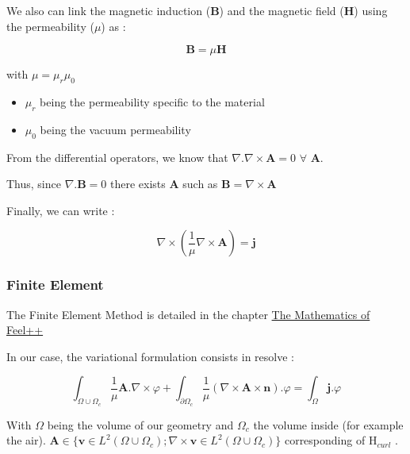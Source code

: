 \documentclass[11pt]{amsart}
\begin{document}
We also can link the magnetic induction (\textbf{B}) and the magnetic field (\textbf{H}) using the permeability ($\mu$) as :



\[
\textbf{B}=\mu\textbf{H}
\]



with $\mu=\mu_{r}\mu_{0}$


\begin{itemize}

\item $\mu_{r}$ being the permeability specific to the material

\item $\mu_{0}$ being the vacuum permeability

\end{itemize}


From the differential operators, we know that $\nabla.\nabla\times\textbf{A}=0$    $\forall$ \textbf{A}.


Thus, since $\nabla.\textbf{B}=0$ there exists \textbf{A} such as $\textbf{B}=\nabla\times \textbf{A}$


Finally, we can write :



\[
\nabla\times\left(\frac{1}{\mu}\nabla\times\textbf{A}\right)=\textbf{j}
\]



\hypertarget{x-finite-element}{\subsubsection{Finite Element}}
The Finite Element Method is detailed in the chapter \href{http://book.feelpp.org/math/fem#cha:appr-r-probl-1}{The Mathematics of Feel++}


In our case, the variational formulation consists in resolve :



\[
\int_{\Omega\cup\Omega_{c}}\frac{1}{\mu}\textbf{A}.\nabla\times\varphi+\int_{\partial\Omega_{c}}\frac{1}{\mu}\left(\nabla\times\textbf{A}\times\textbf{n}\right).\varphi=\int_{\Omega}\textbf{j}.\varphi
\]



With $\Omega$ being the volume of our geometry and $\Omega_{c}$ the volume inside (for example the air).
$\textbf{A}\in\{\textbf{v}\in L^{2}(\Omega\cup\Omega_{c}); \nabla\times\textbf{v}\in L^{2}(\Omega\cup\Omega_{c})\}$
corresponding of H${}_{curl}$ .
\end{document}
